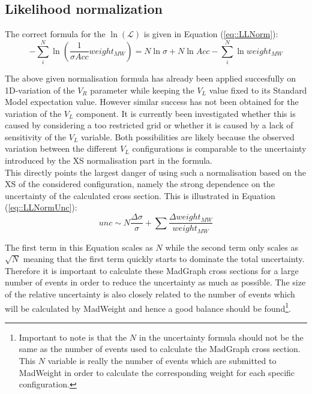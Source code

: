 \subsection{Likelihood normalization}

The correct formula for the $\ln(\mathcal{L})$ is given in Equation (\ref{eq::LLNorm}):
\begin{equation} \label{eq::LLNorm}
 - \sum_{i}^{N} \ln (\frac{1}{\sigma Acc} weight_{MW}) = N \ln \sigma + N \ln Acc - \sum_{i}^{N} \ln weight_{MW}
\end{equation}

The above given normalisation formula has already been applied succesfully on 1D-variation of the $V_R$ parameter while keeping the $V_{L}$ value fixed to its Standard Model expectation value. However similar success has not been obtained for the variation of the $V_L$ component. It is currently been investigated whether this is caused by considering a too restricted grid or whether it is caused by a lack of sensitivity of the $V_L$ variable. Both possibilities are likely because the observed variation between the different $V_L$ configurations is comparable to the uncertainty introduced by the XS normalisation part in the formula.\\

This directly points the largest danger of using such a normalisation based on the XS of the considered configuration, namely the strong dependence on the uncertainty of the calculated cross section. This is illustrated in Equation (\ref{eq::LLNormUnc}):
\begin{equation} \label{eq::LLNormUnc}
 unc \sim N \frac{\Delta \sigma}{\sigma} + \sum \frac{\Delta weight_{MW}}{weight_{MW}}
\end{equation}

The first term in this Equation scales as $N$ while the second term only scales as $\sqrt{N}$ meaning that the first term quickly starts to dominate the total uncertainty. Therefore it is important to calculate these MadGraph cross sections for a large number of events in order to reduce the uncertainty as much as possible. The size of the relative uncertainty is also closely related to the number of events which will be calculated by MadWeight and hence a good balance should be found\footnote{Important to note is that the $N$ in the uncertainty formula should not be the same as the number of events used to calculate the MadGraph cross section. This $N$ variable is really the number of events which are submitted to MadWeight in order to calculate the corresponding weight for each specific configuration.}.


